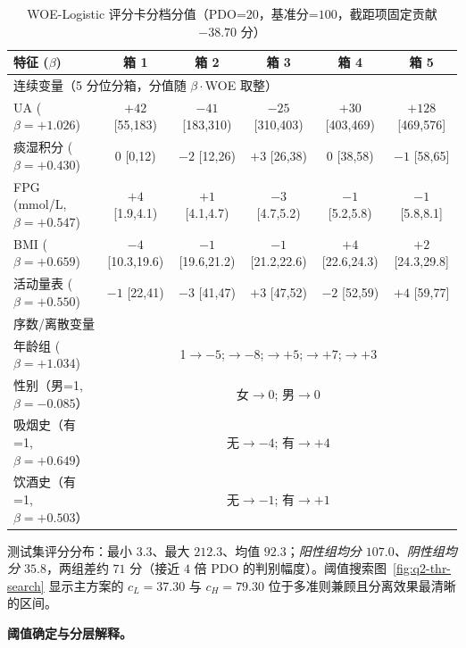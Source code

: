 \documentclass{MathorCupmodeling}
\begin{document}
\begin{table}[H]
\centering\small
\caption{WOE-Logistic 评分卡分档分值（PDO=$20$，基准分=$100$，截距项固定贡献 $-38.70$ 分）}\label{tab:q2-scorecard}
\begin{tabular}{@{}l c c c c c@{}}
\toprule
特征 ($\beta$) & 箱 1 & 箱 2 & 箱 3 & 箱 4 & 箱 5 \\
\midrule
\multicolumn{6}{l}{连续变量（5 分位分箱，分值随 $\beta\cdot$WOE 取整）} \\
UA ($\beta=+1.026$)   & $+42$ \tiny{[55,183)} & $-41$ \tiny{[183,310)} & $-25$ \tiny{[310,403)} & $+30$ \tiny{[403,469)} & $+128$ \tiny{[469,576]} \\
痰湿积分 ($\beta=+0.430$)         & $0$ \tiny{[0,12)} & $-2$ \tiny{[12,26)} & $+3$ \tiny{[26,38)} & $0$ \tiny{[38,58)} & $-1$ \tiny{[58,65]} \\
FPG (mmol/L, $\beta=+0.547$)      & $+4$ \tiny{[1.9,4.1)} & $+1$ \tiny{[4.1,4.7)} & $-3$ \tiny{[4.7,5.2)} & $-1$ \tiny{[5.2,5.8)} & $-1$ \tiny{[5.8,8.1]} \\
BMI ($\beta=+0.659$)              & $-4$ \tiny{[10.3,19.6)} & $-1$ \tiny{[19.6,21.2)} & $-1$ \tiny{[21.2,22.6)} & $+4$ \tiny{[22.6,24.3)} & $+2$ \tiny{[24.3,29.8]} \\
活动量表 ($\beta=+0.550$)         & $-1$ \tiny{[22,41)} & $-3$ \tiny{[41,47)} & $+3$ \tiny{[47,52)} & $-2$ \tiny{[52,59)} & $+4$ \tiny{[59,77]} \\
\midrule
\multicolumn{6}{l}{序数/离散变量} \\
年龄组 ($\beta=+1.034$)           & \multicolumn{5}{c}{1$\to$$-5$;\; 2$\to$$-8$;\; 3$\to$$+5$;\; 4$\to$$+7$;\; 5$\to$$+3$} \\
性别（男=1, $\beta=-0.085$）       & \multicolumn{5}{c}{女$\to$$0$;\; 男$\to$$0$} \\
吸烟史（有=1, $\beta=+0.649$）     & \multicolumn{5}{c}{无$\to$$-4$;\; 有$\to$$+4$} \\
饮酒史（有=1, $\beta=+0.503$）     & \multicolumn{5}{c}{无$\to$$-1$;\; 有$\to$$+1$} \\
\bottomrule
\end{tabular}
\end{table}

测试集评分分布：最小 $3.3$、最大 $212.3$、均值 $92.3$；\emph{阳性组均分 $107.0$、阴性组均分 $35.8$}，两组差约 $71$ 分（接近 $4$ 倍 PDO 的判别幅度）。阈值搜索图~\cref{fig:q2-thr-search} 显示主方案的 $c_L=37.30$ 与 $c_H=79.30$ 位于多准则兼顾且分离效果最清晰的区间。

\noindent\textbf{阈值确定与分层解释。}
\end{document}
